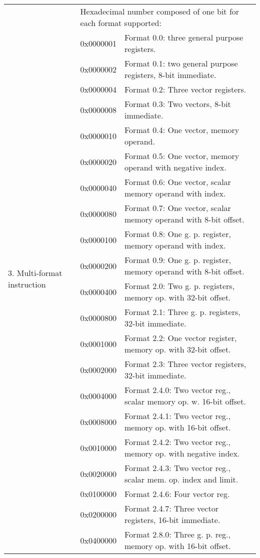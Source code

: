 \documentclass[forwardcom.tex]{subfiles}
\begin{document}
\begin{longtable} {|p{18mm}|p{14mm} p{80mm}|}
\multirow{27}{*}{\parbox[t]{18mm}{3. Multi-format instruction}} 
  &  \multicolumn{2}{|l|}{
     Hexadecimal number composed of one bit for each format supported:} \\
  &  0x0000001 & Format 0.0: three general purpose registers. \\
  &  0x0000002 & Format 0.1: two general purpose registers, 8-bit immediate. \\
  &  0x0000004 & Format 0.2: Three vector registers. \\
  &  0x0000008 & Format 0.3: Two vectors, 8-bit immediate. \\
  &  0x0000010 & Format 0.4: One vector, memory operand. \\
  &  0x0000020 & Format 0.5: One vector, memory operand with negative index. \\
  &  0x0000040 & Format 0.6: One vector, scalar memory operand with index. \\
  &  0x0000080 & Format 0.7: One vector, scalar memory operand with 8-bit offset. \\
  &  0x0000100 & Format 0.8: One g. p. register, memory operand with index. \\
  &  0x0000200 & Format 0.9: One g. p. register, memory operand with 8-bit offset. \\
  &  0x0000400 & Format 2.0: Two g. p. registers, memory op. with 32-bit offset. \\
  &  0x0000800 & Format 2.1: Three g. p. registers, 32-bit immediate. \\
  &  0x0001000 & Format 2.2: One vector register, memory op. with 32-bit offset. \\
  &  0x0002000 & Format 2.3: Three vector registers, 32-bit immediate. \\
  &  0x0004000 & Format 2.4.0: Two vector reg., scalar memory op. w. 16-bit offset. \\
  &  0x0008000 & Format 2.4.1: Two vector reg., memory op. with 16-bit offset. \\
  &  0x0010000 & Format 2.4.2: Two vector reg., memory op. with negative index. \\
  &  0x0020000 & Format 2.4.3: Two vector reg., scalar mem. op. index and limit. \\
  &  0x0100000 & Format 2.4.6: Four vector reg. \\
  &  0x0200000 & Format 2.4.7: Three vector registers, 16-bit immediate.\\
  &  0x0400000 & Format 2.8.0: Three g. p. reg., memory op. with 16-bit offset. \\

\end{longtable}
\end{document}
